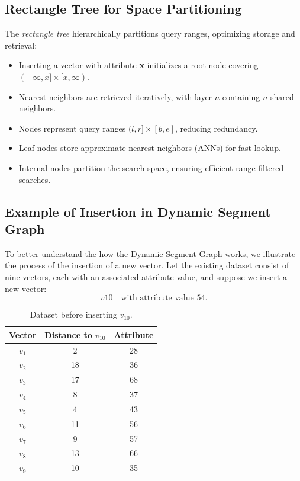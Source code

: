 \subsection{Rectangle Tree for Space Partitioning}  
The \textit{rectangle tree} hierarchically partitions query ranges, optimizing storage and retrieval:  
\begin{itemize}  
    \item Inserting a vector with attribute \textbf{x} initializes a root node covering $(-\infty, x] \times [x, \infty)$.  
    \item Nearest neighbors are retrieved iteratively, with layer $n$ containing $n$ shared neighbors.  
    \item Nodes represent query ranges $(l, r] \times [b, e]$, reducing redundancy.  
    \item Leaf nodes store approximate nearest neighbors (ANNs) for fast lookup.  
    \item Internal nodes partition the search space, ensuring efficient range-filtered searches.  
\end{itemize}  


\subsection{Example of Insertion in Dynamic Segment Graph}
To better understand the how the Dynamic Segment Graph works, we illustrate the process of the insertion of a new vector. Let the existing dataset consist of nine vectors, each with an associated attribute value, and suppose we insert a new vector:
\[
v10 \quad \text{with attribute value } 54.
\]


\begin{table}[h]
    \centering
    \begin{tabular}{c|c|c}
        \hline
        \textbf{Vector} & \textbf{Distance to $v_{10}$} & \textbf{Attribute} \\
        \hline
        $v_1$ & 2  & 28  \\
        $v_2$ & 18 & 36  \\
        $v_3$ & 17 & 68  \\
        $v_4$ & 8  & 37  \\
        $v_5$ & 4  & 43  \\
        $v_6$ & 11 & 56  \\
        $v_7$ & 9  & 57  \\
        $v_8$ & 13 & 66  \\
        $v_9$ & 10 & 35  \\
        \hline
    \end{tabular}
    \caption{Dataset before inserting $v_{10}$.}
\end{table}


